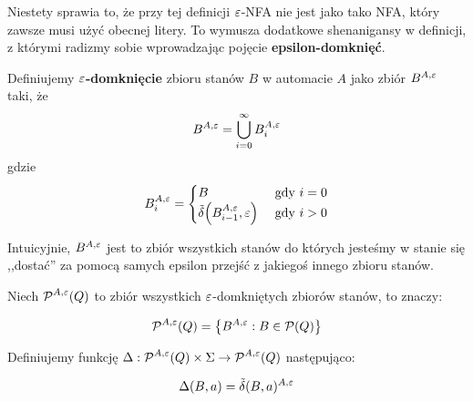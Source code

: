 Niestety sprawia to, że przy tej definicji \( \varepsilon \)-NFA nie jest jako tako NFA, który zawsze musi użyć obecnej litery. To wymusza dodatkowe shenanigansy w definicji, z którymi radizmy sobie wprowadzając pojęcie \textbf{epsilon-domknięć}.

\begin{definition}
    Definiujemy \(\mathbf{\varepsilon}\)\textbf{-domknięcie} zbioru stanów \( B \) w automacie \(A\) jako zbiór \( B^{A, \varepsilon} \) taki, że
    \[
        B^{A, \varepsilon} = \bigcup_{i=0}^\infty B_i^{A, \varepsilon}
    \]
    gdzie
    \[
        B_i^{A, \eps} = \begin{cases}
            B & \text{ gdy } i = 0 \\
            \tilde \delta\pars{B_{i-1}^{A, \eps}, \eps} & \text{ gdy } i > 0
        \end{cases}
    \]
\end{definition}

Intuicyjnie, \( B^{A, \varepsilon} \) jest to zbiór wszystkich stanów do których jesteśmy w stanie się ,,dostać'' za pomocą samych epsilon przejść z jakiegoś innego zbioru stanów. 

\begin{definition}
     Niech \(\operatorname{\mathcal{P}}^{A, \varepsilon}(Q) \) to zbiór wszystkich \(\varepsilon\)-domkniętych zbiorów stanów, to znaczy: 
     
     \[ 
        \powerset^{A, \eps}(Q) = \set{B^{A, \eps} : B \in \powerset(Q)}
     \]
\end{definition}

\begin{definition}
    Definiujemy funkcję \( \Delta : \operatorname{\mathcal{P}}^{A, \varepsilon}(Q) \times \Sigma \rightarrow  \operatorname{\mathcal{P}}^{A, \varepsilon}(Q) \) następująco: 
    
    \begin{equation*}
        \Delta(B,a) = \tilde \delta (B,a)^{A, \varepsilon}
    \end{equation*}
\end{definition}
